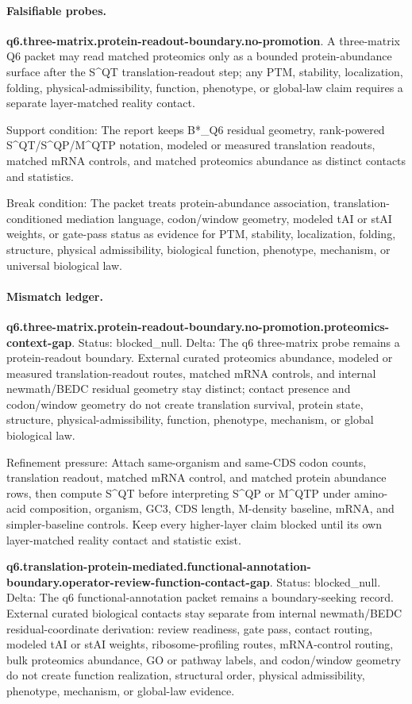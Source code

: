\paragraph{Falsifiable probes.}
\textbf{q6.three-matrix.protein-readout-boundary.no-promotion}. A three-matrix Q6 packet may read matched proteomics only as a bounded protein-abundance surface after the S\textasciicircum{}QT translation-readout step; any PTM, stability, localization, folding, physical-admissibility, function, phenotype, or global-law claim requires a separate layer-matched reality contact.

Support condition: The report keeps B*\_Q6 residual geometry, rank-powered S\textasciicircum{}QT/S\textasciicircum{}QP/M\textasciicircum{}QTP notation, modeled or measured translation readouts, matched mRNA controls, and matched proteomics abundance as distinct contacts and statistics.

Break condition: The packet treats protein-abundance association, translation-conditioned mediation language, codon/window geometry, modeled tAI or stAI weights, or gate-pass status as evidence for PTM, stability, localization, folding, structure, physical admissibility, biological function, phenotype, mechanism, or universal biological law.

\paragraph{Mismatch ledger.}
\textbf{q6.three-matrix.protein-readout-boundary.no-promotion.proteomics-context-gap}. Status: blocked\_null. Delta: The q6 three-matrix probe remains a protein-readout boundary. External curated proteomics abundance, modeled or measured translation-readout routes, matched mRNA controls, and internal newmath/BEDC residual geometry stay distinct; contact presence and codon/window geometry do not create translation survival, protein state, structure, physical-admissibility, function, phenotype, mechanism, or global biological law.

Refinement pressure: Attach same-organism and same-CDS codon counts, translation readout, matched mRNA control, and matched protein abundance rows, then compute S\textasciicircum{}QT before interpreting S\textasciicircum{}QP or M\textasciicircum{}QTP under amino-acid composition, organism, GC3, CDS length, M-density baseline, mRNA, and simpler-baseline controls. Keep every higher-layer claim blocked until its own layer-matched reality contact and statistic exist.

\textbf{q6.translation-protein-mediated.functional-annotation-boundary.operator-review-function-contact-gap}. Status: blocked\_null. Delta: The q6 functional-annotation packet remains a boundary-seeking record. External curated biological contacts stay separate from internal newmath/BEDC residual-coordinate derivation: review readiness, gate pass, contact routing, modeled tAI or stAI weights, ribosome-profiling routes, mRNA-control routing, bulk proteomics abundance, GO or pathway labels, and codon/window geometry do not create function realization, structural order, physical admissibility, phenotype, mechanism, or global-law evidence.

